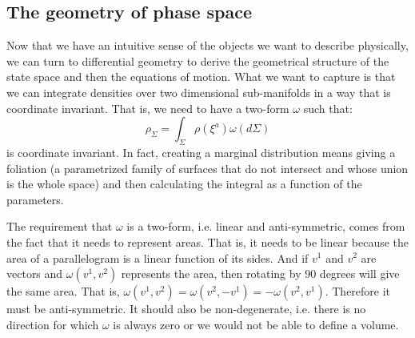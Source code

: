 \documentclass[11pt]{article}
\begin{document}


\subsection*{The geometry of phase space}

Now that we have an intuitive sense of the objects we want to describe physically, we can turn to differential geometry to derive the geometrical structure of the state space and then the equations of motion. What we want to capture is that we can integrate densities over two dimensional sub-manifolds in a way that is coordinate invariant. That is, we need to have a two-form $\omega$ such that:
\begin{equation}
\rho_\Sigma = \int_\Sigma \rho(\xi^a) \omega(d\Sigma)
\end{equation}
is coordinate invariant. In fact, creating a marginal distribution means giving a foliation (a parametrized family of surfaces that do not intersect and whose union is the whole space) and then calculating the integral as a function of the parameters.

The requirement that $\omega$ is a two-form, i.e. linear and anti-symmetric, comes from the fact that it needs to represent areas. That is, it needs to be linear because the area of a parallelogram is a linear function of its sides. And if $v^1$ and $v^2$ are vectors and $\omega(v^1, v^2)$ represents the area, then rotating by 90 degrees will give the same area. That is, $\omega(v^1, v^2) = \omega(v^2, -v^1) = -\omega(v^2, v^1)$. Therefore it must be anti-symmetric. It should also be non-degenerate, i.e. there is no direction for which $\omega$ is always zero or we would not be able to define a volume.
\end{document}
